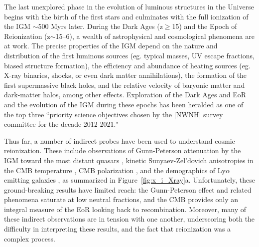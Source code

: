 \documentclass[preprint]{aastex}
\begin{document}
The last unexplored phase in the evolution of luminous structures in the
Universe begins with the birth of the first stars and culminates with the full
ionization of the IGM $\sim$500 Myrs later.  During the Dark Ages
(z$\ge$15) and the Epoch of Reionization (z$\sim$15--6), a wealth of
astrophysical and cosmological phenomena are at work.  The precise properties
of the IGM depend on the nature and distribution of the first luminous sources
(eg. typical masses, UV escape fractions, biased structure formation), the
efficiency and abundance of heating sources (eg.  X-ray binaries, shocks, or
even dark matter annihilations), the formation of the first supermassive black
holes, and the relative velocity of baryonic matter and dark-matter halos,
among other effects.  Exploration of the Dark Ages and EoR and the evolution of
the IGM during these epochs has been heralded as one of the top three
``priority science objectives chosen by the [NWNH] survey committee for the
decade 2012-2021."

Thus far, a number of indirect probes have been used to understand cosmic
reionization.  These include observations of Gunn-Peterson attenuation by the
IGM toward the most distant quasars \citep{fan_et_al2006},
kinetic Sunyaev-Zel'dovich anisotropies in the CMB temperature \citep{zahn_et_al2012_trunc}, CMB
polarization \citep{page_et_al2007,planck_et_al2013}, and the
demographics of Ly$\alpha$ emitting galaxies
\citep{treu_et_al2013}, as summarized in Figure~\ref{fig:x_i_Xray}a.  Unfortunately,
these ground-breaking results have limited reach: the
Gunn-Peterson effect and related phenomena saturate at low neutral fractions,
and the CMB provides only an integral measure of %
the EoR looking %
back to recombination.  Moreover, many of these indirect observations are in
tension with one another, underscoring both the difficulty in interpreting
these results, and the fact that reionization was a complex process.
\end{document}
